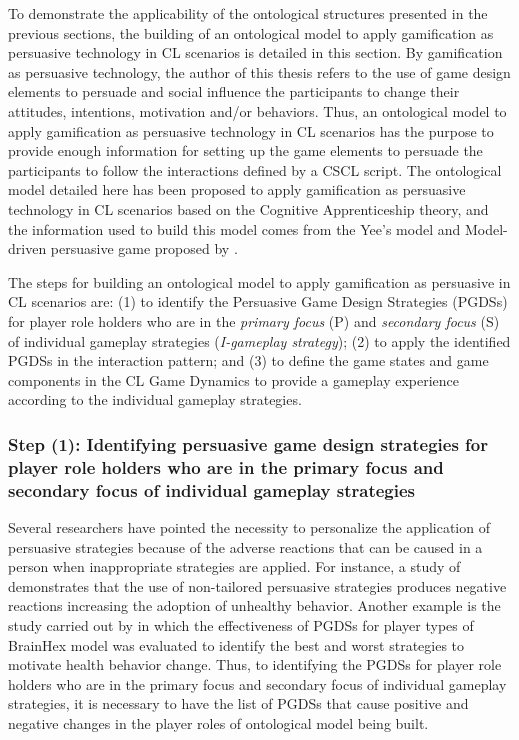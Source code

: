 To demonstrate the applicability of the ontological structures presented in the previous sections, the building of an ontological model to apply gamification as persuasive technology in CL scenarios is detailed in this section.
By gamification as persuasive technology, the author of this thesis refers to the use of game design elements to persuade and social influence the participants to change their attitudes, intentions, motivation and/or behaviors.
Thus, an ontological model to apply gamification as persuasive technology in CL scenarios has the purpose to provide enough information for setting up the game elements to persuade the participants to follow the interactions defined by a CSCL script.
The ontological model detailed here has been proposed to apply gamification as persuasive technology in CL scenarios based on the Cognitive Apprenticeship theory, and the information used to build this model comes from the Yee's model \cite{Yee2006} and Model-driven persuasive game proposed by .

The steps for building an ontological model to apply gamification as persuasive in CL scenarios are:
(1) to identify the Persuasive Game Design Strategies (PGDSs) for player role holders who are in the \emph{primary focus} (P) and \emph{secondary focus} (S) of individual gameplay strategies (\emph{I-gameplay strategy});
(2) to apply the identified PGDSs in the interaction pattern; and
(3) to define the game states and game components in the CL Game Dynamics to provide a gameplay experience according to the individual gameplay strategies.

\subsubsection*{Step (1): Identifying persuasive game design strategies for player role holders who are in the primary focus and secondary focus of individual gameplay strategies}

Several researchers have pointed the necessity to personalize the application of persuasive strategies because of the adverse reactions that can be caused in a person when inappropriate strategies are applied.
For instance, a study of  demonstrates that the use of non-tailored persuasive strategies produces negative reactions increasing the adoption of unhealthy behavior.
Another example is the study carried out by  in which the effectiveness of PGDSs for player types of BrainHex model was evaluated to identify the best and worst strategies to motivate health behavior change.
Thus, to identifying the PGDSs for player role holders who are in the primary focus and secondary focus of individual gameplay strategies, it is necessary to have the list of PGDSs that cause positive and negative changes in the player roles of ontological model being built.
 
